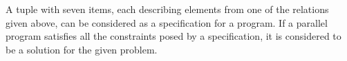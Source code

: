 A tuple with seven items, each describing elements from one of the relations given above, can be considered as a specification for a program. If a parallel program satisfies all the constraints posed by a specification, it is considered to be a solution for the given problem.




